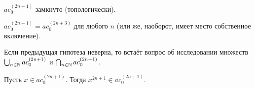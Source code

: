 

\begin{hypothesis}
	$ac_0^{(2n+1)}$ замкнуто (топологически).
\end{hypothesis}

\begin{hypothesis}
	$ac_0^{(2n+1)} = ac_0^{(2n+3)}$ для любого $n$ (или же, наоборот, имеет место собственное включение).
\end{hypothesis}

\begin{hypothesis}
	Если предыдущая гипотеза неверна, то встаёт вопрос об исследовании множеств
	$\bigcup_{n\in\mathbb{N}}ac_0^{(2n+1)}$ и 	$\bigcap_{n\in\mathbb{N}}ac_0^{(2n+1)}$.
\end{hypothesis}

\begin{hypothesis}
	Пусть $x\in ac_0^{(2n+1)}$.
	Тогда $x^{2n+1} \in ac_0^{(2n+1)}$.
\end{hypothesis}

